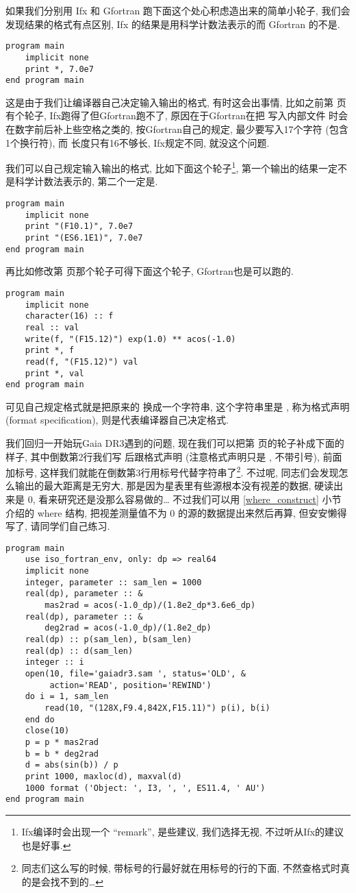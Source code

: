 如果我们分别用 Ifx 和 Gfortran 跑下面这个处心积虑造出来的简单小轮子, 我们会发现结果的格式有点区别, Ifx 的结果是用科学计数法表示的而 Gfortran 的不是. 
\begin{lstlisting}
program main
    implicit none
    print *, 7.0e7
end program main
\end{lstlisting}
这是由于我们让编译器自己决定输入输出的格式, 有时这会出事情, 比如之前第 \pageref{internal_file} 页有个轮子, Ifx跑得了但Gfortran跑不了, 原因在于Gfortran在把  写入内部文件  时会在数字前后补上些空格之类的, 按Gfortran自己的规定, 最少要写入17个字符 (包含1个换行符), 而  长度只有16不够长, Ifx规定不同, 就没这个问题. 

我们可以自己规定输入输出的格式, 比如下面这个轮子\footnote{Ifx编译时会出现一个 ``remark'', 是些建议, 我们选择无视, 不过听从Ifx的建议也是好事.}, 第一个输出的结果一定不是科学计数法表示的, 第二个一定是. 
\begin{lstlisting}
program main
    implicit none
    print "(F10.1)", 7.0e7
    print "(ES6.1E1)", 7.0e7
end program main
\end{lstlisting}
再比如修改第 \pageref{internal_file} 页那个轮子可得下面这个轮子, Gfortran也是可以跑的. 
\begin{lstlisting}
program main
    implicit none
    character(16) :: f
    real :: val
    write(f, "(F15.12)") exp(1.0) ** acos(-1.0)
    print *, f
    read(f, "(F15.12)") val
    print *, val
end program main
\end{lstlisting}
可见自己规定格式就是把原来的 \ttt{*} 换成一个字符串, 这个字符串里是 , 称为格式声明 (format specification), \ttt{*} 则是代表编译器自己决定格式. 

我们回归一开始玩Gaia DR3遇到的问题, 现在我们可以把第 \pageref{gaiadr3.sam} 页的轮子补成下面的样子, 其中倒数第2行我们写  后跟格式声明 (注意格式声明只是 , 不带引号), 前面加标号, 这样我们就能在倒数第3行用标号代替字符串了\footnote{同志们这么写的时候, 带标号的行最好就在用标号的行的下面, 不然查格式时真的是会找不到的\dots{}}. 不过呢, 同志们会发现怎么输出的最大距离是无穷大, 那是因为星表里有些源根本没有视差的数据, 硬读出来是 $ 0 $, 看来研究还是没那么容易做的\dots{} 不过我们可以用 \ref{where_construct} 小节介绍的 where 结构, 把视差测量值不为 $0$ 的源的数据提出来然后再算, 但安安懒得写了, 请同学们自己练习.
\begin{lstlisting}
program main
    use iso_fortran_env, only: dp => real64
    implicit none
    integer, parameter :: sam_len = 1000
    real(dp), parameter :: &
        mas2rad = acos(-1.0_dp)/(1.8e2_dp*3.6e6_dp)
    real(dp), parameter :: &
        deg2rad = acos(-1.0_dp)/(1.8e2_dp)
    real(dp) :: p(sam_len), b(sam_len)
    real(dp) :: d(sam_len)
    integer :: i
    open(10, file='gaiadr3.sam ', status='OLD', &
         action='READ', position='REWIND')
    do i = 1, sam_len
        read(10, "(128X,F9.4,842X,F15.11)") p(i), b(i)
    end do
    close(10)
    p = p * mas2rad
    b = b * deg2rad
    d = abs(sin(b)) / p
    print 1000, maxloc(d), maxval(d)
    1000 format ('Object: ', I3, ', ', ES11.4, ' AU')
end program main
\end{lstlisting}

